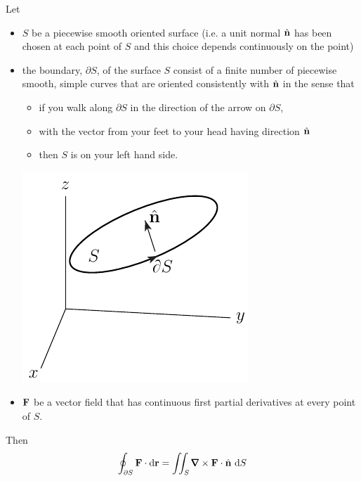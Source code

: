 \begin{theorem}\label{thm:Stokes}
Let 
\begin{itemize}\itemsep1pt \parskip0pt  %
\item
$S$ be a piecewise smooth oriented surface (i.e. a unit normal $\hat{\mathbf{n}}$ has 
been chosen at each point of $S$ and this choice depends continuously
on the point)
\item
the boundary, $\partial S$, of the surface $S$ consist of a finite number of piecewise smooth, simple curves that are oriented consistently with $\hat{\mathbf{n}}$ in the sense that
    \begin{itemize}\itemsep1pt \parskip0pt  %
    \item
    if you walk along $\partial S$ in the direction of the arrow
    on $\partial S$,
     \item
     with the vector from your feet to your head  having direction $\hat{\mathbf{n}}$
    \item
    then $S$ is on your left hand side.
    \end{itemize}

\begin{center}
    \includegraphics{stokes0.pdf}
\end{center}


\item
$\mathbf{F}$ be a vector field that has continuous first partial derivatives 
at every point of $S$.
\end{itemize}
Then
\begin{equation*}
\oint_{\partial S}\vF\cdot \dee{\vr}
  =\dblInt_{S}\vnabla\times\vF\cdot\hn\ \dee{S}
\end{equation*}

\end{theorem}
